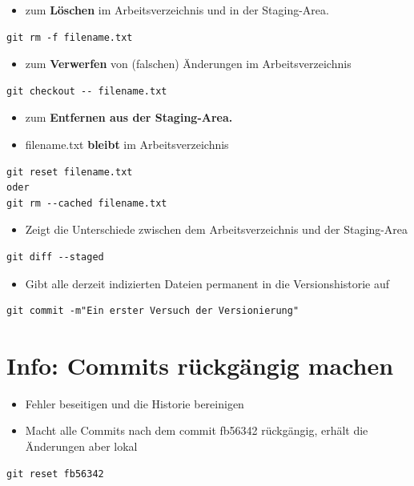 \documentclass[11pt]{article}
\begin{document}
\begin{itemize}
\item zum \textbf{Löschen} im Arbeitsverzeichnis und in  der Staging-Area.
\end{itemize}
\begin{verbatim}
git rm -f filename.txt
\end{verbatim}


\begin{itemize}
\item zum \textbf{Verwerfen} von (falschen) Änderungen im Arbeitsverzeichnis
\end{itemize}
\begin{verbatim}
git checkout -- filename.txt
\end{verbatim}

\begin{itemize}
\item zum \textbf{Entfernen aus der Staging-Area.}
\item filename.txt \textbf{bleibt} im Arbeitsverzeichnis
\end{itemize}
\begin{verbatim}
git reset filename.txt
oder
git rm --cached filename.txt
\end{verbatim}


\begin{itemize}
\item Zeigt die Unterschiede zwischen dem Arbeitsverzeichnis und der Staging-Area
\end{itemize}
\begin{verbatim}
git diff --staged
\end{verbatim}


\begin{itemize}
\item Gibt alle derzeit indizierten Dateien permanent in die Versionshistorie auf
\end{itemize}
\begin{verbatim}
git commit -m"Ein erster Versuch der Versionierung"
\end{verbatim}


\section{Info: Commits rückgängig machen}
\label{sec:org217cc9d}

\begin{itemize}
\item Fehler beseitigen und die Historie bereinigen

\item Macht alle Commits nach dem commit fb56342 rückgängig, erhält die Änderungen aber lokal
\end{itemize}
\begin{verbatim}
git reset fb56342
\end{verbatim}
\end{document}
